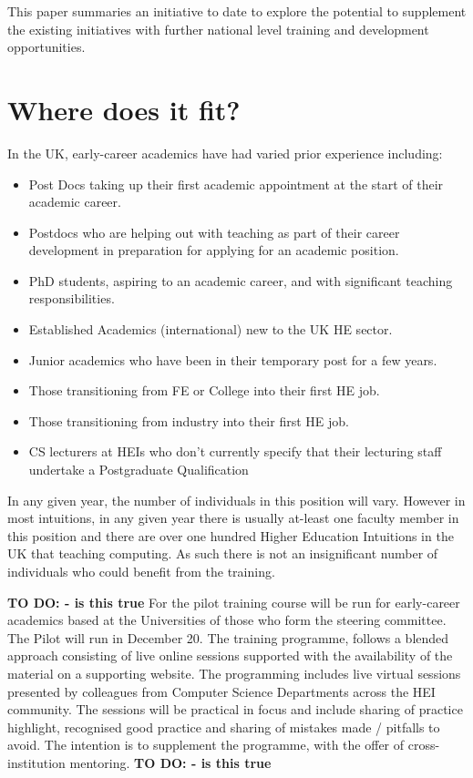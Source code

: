\documentclass[sigconf]{acmart}
\begin{document}
This paper summaries an initiative to date to explore the potential to supplement the existing initiatives with further national level training and development opportunities.

\section{Where does it fit?}
In the UK, early-career academics have had varied prior experience including:
\begin{itemize}
\item Post Docs taking up their first academic appointment at the start of their academic career.
\item Postdocs who are helping out with teaching as part of their career development in preparation for applying for an academic position.
\item PhD students, aspiring to an academic career, and with significant teaching responsibilities.
\item Established Academics (international) new to the UK HE sector.
\item Junior academics who have been in their temporary post for a few years.
\item Those transitioning from FE or College into their first HE job.
\item Those transitioning from industry into their first HE job.
\item CS lecturers at HEIs who don’t currently specify that their lecturing staff undertake  a Postgraduate Qualification
\end{itemize}

In any given year, the number of individuals in this position will vary. However in most intuitions, in any given year there is usually at-least one faculty member in this position and there are over one hundred Higher Education Intuitions in the UK that teaching computing. As such there is not an insignificant number of individuals who could benefit from the training.

\textbf{TO DO: - is this true}
For the pilot training course will be run for early-career academics based at the Universities of those who form the steering committee. The Pilot will run in December 20. The training programme, follows a blended approach consisting of live online sessions supported with the availability of the material on a supporting website. The programming includes live virtual sessions presented by colleagues from Computer Science Departments across the HEI community. The sessions will be practical in focus and include sharing of practice highlight, recognised good practice and sharing of mistakes made / pitfalls to avoid. The intention is to supplement the programme, with the offer of cross-institution mentoring.
\textbf{TO DO: - is this true}
\end{document}
